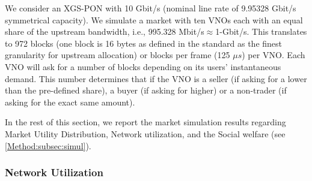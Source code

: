 We consider an XGS-PON \cite{G.9807.1} with 10 Gbit/s (nominal line rate of 9.95328 Gbit/s symmetrical capacity). We simulate a market with ten \acp{VNO} each with an equal share of the upstream bandwidth, i.e., 995.328 Mbit/s$\approx$1-Gbit/s. This translates to 972 blocks (one block is 16 bytes as defined in the standard \cite{G.9807.1} as the finest granularity for upstream allocation) or blocks per frame (125 $\mu s$) per VNO.
Each \ac{VNO} will ask for a number of blocks depending on its users' instantaneous demand. This number determines that if the \ac{VNO} is a seller (if asking for a lower than the pre-defined share), a buyer (if asking for higher) or a non-trader (if asking for the exact same amount).



In the rest of this section, we report the market simulation results regarding Market Utility Distribution, Network utilization, and the Social welfare (see \autoref{Method:subsec:simul}). 


\subsubsection{Network Utilization}

